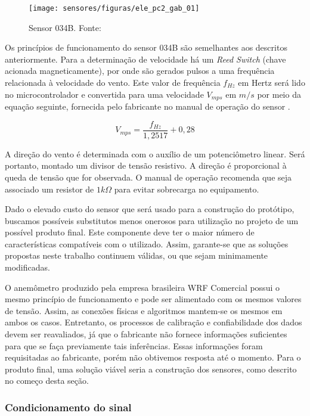 		\begin{figure}
			\centering
			\texttt{[image: sensores/figuras/ele\_pc2\_gab\_01]}
			\caption{Sensor 034B. Fonte: \cite{bib_sen_gab_01}}
			\label{ele_sen_gab_01}
		\end{figure}
		
		Os princípios de funcionamento do sensor 034B são semelhantes aos descritos anteriormente. Para a determinação de velocidade há um \emph{Reed Switch} (chave acionada magneticamente), por onde são gerados pulsos a uma frequência relacionada à velocidade do vento. Este valor de frequência $f_{Hz}$ em Hertz será lido no microcontrolador e convertida para uma velocidade $V_{mps}$ em $m/s$  por meio da equação seguinte, fornecida pelo fabricante no manual de operação do sensor \cite{bib_sen_gab_02}.
		
		\begin{equation}
			V_{mps} = \frac{f_{Hz}}{1,2517} + 0,28	
		\end{equation}
		
		A direção do vento é determinada com o auxílio de um potenciômetro linear. Será portanto, montado um divisor de tensão resistivo. A direção é proporcional à queda de tensão que for observada. O manual de operação recomenda que seja associado um resistor de $1 k \Omega$ para evitar sobrecarga no equipamento.
		
		Dado o elevado custo do sensor que será usado para a construção do protótipo, buscamos possíveis substitutos menos onerosos para utilização no projeto de um possível produto final. Este componente deve ter o maior número de características compatíveis com o utilizado. Assim, garante-se que as soluções propostas neste trabalho continuem válidas, ou que sejam minimamente modificadas.
		
		O anemômetro produzido pela empresa brasileira WRF Comercial possui o mesmo princípio de funcionamento e pode ser alimentado com os mesmos valores de tensão. Assim, as conexões físicas e algoritmos mantem-se os mesmos em ambos os casos. Entretanto, os processos de calibração e confiabilidade dos dados devem ser reavaliados, já que o fabricante não fornece informações suficientes para que se faça previamente tais inferências. Essas informações foram requisitadas ao fabricante, porém não obtivemos resposta até o momento. Para o produto final, uma solução viável seria a construção dos sensores, como descrito no começo desta seção.

		\subsubsection{Condicionamento do sinal}

